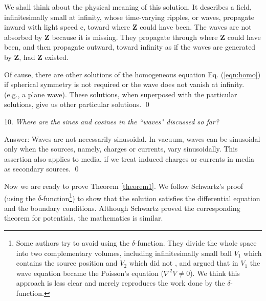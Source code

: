 \documentclass[11pt]{article}              %
\begin{document}
We shall think about the physical meaning of this solution. It describes a field, infinitesimally small at infinity, whose time-varying ripples, or waves, propagate inward with light speed c, toward where ${\mathbf Z}$ could have been. The waves are not absorbed by ${\mathbf Z}$ because it is missing. They propagate through where ${\mathbf Z}$ could have been, and then propagate outward, toward infinity as if the waves are generated by ${\mathbf Z}$, had ${\mathbf Z}$ existed. 

Of cause, there are other solutions of the homogeneous equation Eq. (\ref{eqn:homo}) if spherical symmetry is not required or the wave does not vanish at infinity. (e.g., a plane wave). These solutions, when superposed with the particular solutions, give us other particular solutions.
\qed

10. {\it Where are the sines and cosines in the ``waves" discussed so far?}

Answer: Waves are not necessarily sinusoidal. In vacuum, waves can be sinusoidal only when the sources, namely, charges or currents, vary sinusoidally. This assertion also applies to media, if we treat induced charges or currents in media as secondary sources. \qed

Now we are ready to prove Theorem \ref{theorem1}. We follow Schwartz's proof \cite{schwartz1972principles} (using the $\delta$-function\footnote{Some authors try to avoid using the $\delta$-function. They divide the whole space into two complementary volumes, including infinitesimally small ball $V_1$ which contains the source position and $V_2$ which did not 
\cite{becker1982electromagnetic} \cite{heald1995classical} \cite{jefimenko2004electromagnetic} \cite{steane2012relativity}, and argued that in $V_1$ the wave equation became the Poisson's equation ($\nabla^2 V \neq 0$). We think this approach is less clear and merely reproduces the work done by the $\delta$-function.}) to show that the solution satisfies the differential equation and the boundary conditions. Although Schwartz proved the corresponding theorem for potentials, the mathematics is similar.
\end{document}

